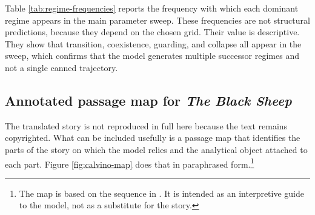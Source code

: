 Table \ref{tab:regime-frequencies} reports the frequency with which each dominant regime appears in the main parameter sweep. These frequencies are not structural predictions, because they depend on the chosen grid. Their value is descriptive. They show that transition, coexistence, guarding, and collapse all appear in the sweep, which confirms that the model generates multiple successor regimes and not a single canned trajectory.

\begin{table}[tbp]
    \centering
    \caption{Dominant regime frequencies in the main parameter sweep. The table reports how often each regime is the dominant late period outcome over the grid used to produce the phase diagram.}
    \label{tab:regime-frequencies}
    
\end{table}

\subsection{Annotated passage map for \emph{The Black Sheep}}

The translated story is not reproduced in full here because the text remains copyrighted. What can be included usefully is a passage map that identifies the parts of the story on which the model relies and the analytical object attached to each part. Figure \ref{fig:calvino-map} does that in paraphrased form.\footnote{The map is based on the sequence in \citet{calvino_1993}. It is intended as an interpretive guide to the model, not as a substitute for the story.}

